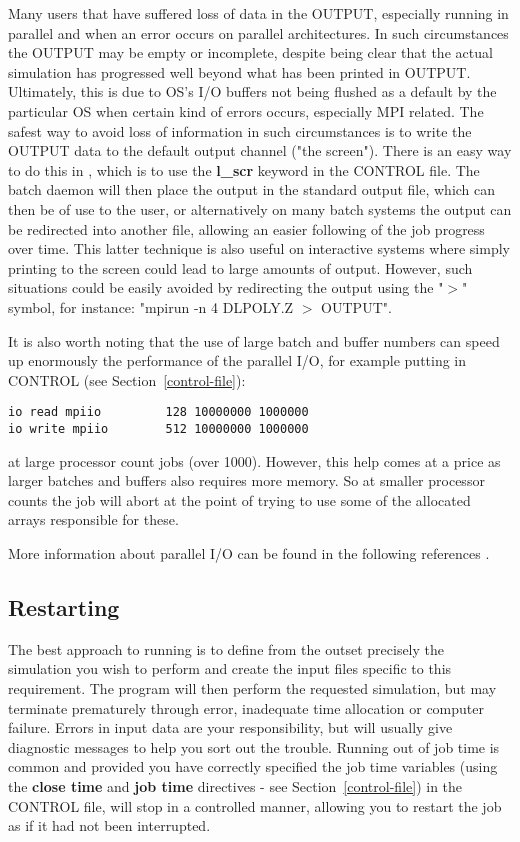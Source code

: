 Many users that have suffered loss of data in the OUTPUT, especially
running in parallel and when an error occurs on parallel architectures.
In such circumstances the OUTPUT may be empty or incomplete, despite
being clear that the actual simulation has progressed well beyond what
has been printed in OUTPUT.  Ultimately, this is due to OS's I/O
buffers not being flushed as a default by the particular OS when
certain kind of errors occurs, especially MPI related.  The safest way
to avoid loss of information in such circumstances is to write the
OUTPUT data to the default output channel ("the screen").  There is an
easy way to do this in \D, which is to use the {\bf l\_scr} keyword in
the CONTROL file.  The batch daemon will then place the output in the
standard output file, which can then be of use to the user, or
alternatively on many batch systems the output can be redirected into
another file, allowing an easier following of the job progress over
time.  This latter technique is also useful on interactive systems
where simply printing to the screen could lead to large amounts of
output.  However, such situations could be easily avoided by
redirecting the output using the "$>$" symbol, for instance:
"mpirun -n 4 DLPOLY.Z $>$ OUTPUT".

It is also worth noting that the use of large batch and buffer
numbers can speed up enormously the performance of the parallel I/O,
for example putting in CONTROL (see Section~\ref{control-file}):
\begin{verbatim}
io read mpiio         128 10000000 1000000
io write mpiio        512 10000000 1000000
\end{verbatim}
at large processor count jobs (over 1000).  However, this help comes
at a price as larger batches and buffers also requires more memory.
So at smaller processor counts the job will abort at the point of
trying to use some of the allocated arrays responsible for these.

More information about \D parallel I/O can be found in the following
references \cite{todorov-09a,todorov-08a,bush-10a}.

\subsection{Restarting}

The best approach to running \D is to define from the outset
precisely the simulation you wish to perform and create the input
files specific to this requirement.  The program will then perform
the requested simulation, but may terminate prematurely through
error, inadequate time allocation or computer failure.  Errors in
input data are your responsibility, but \D will usually give
diagnostic messages to help you sort out the trouble.  Running out
of job time is common and provided you have correctly specified
the job time variables (using the {\bf close time} and {\bf job
time} directives - see Section~\ref{control-file}) in the CONTROL
file, \D will stop in a controlled manner, allowing you to restart
the job as if it had not been interrupted.

